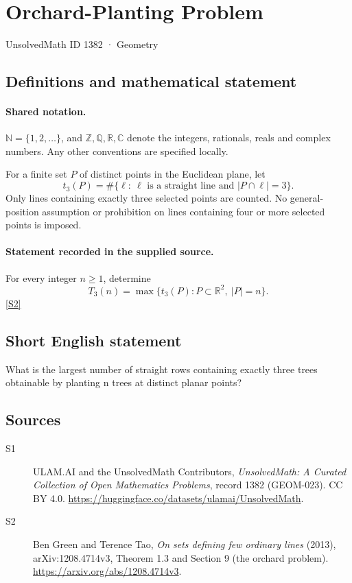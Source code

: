 \documentclass[11pt]{article}
\newcommand{\sref}[2]{\hyperlink{source:#1:#2}{[S#2]}}
\begin{document}
\setcounter{section}{1381}
\section{Orchard-Planting Problem}\label{1382}
{\small\sffamily UnsolvedMath ID 1382 · Geometry}
\subsection{Definitions and mathematical statement}

\paragraph{Shared notation.}$\mathbb N=\{1,2,\ldots\}$, and $\mathbb Z,\mathbb Q,\mathbb R,\mathbb C$ denote the integers, rationals, reals and complex numbers. Any other conventions are specified locally.


For a finite set $P$ of distinct points in the Euclidean plane, let
\[
 t_3(P)=\#\{\ell:\ \ell\text{ is a straight line and }|P\cap\ell|=3\}.
\]
Only lines containing exactly three selected points are counted. No general-position assumption or prohibition on lines containing four or more selected points is imposed.
\paragraph{Statement recorded in the supplied source.}
For every integer $n\ge1$, determine
\[
 T_3(n)=\max\{t_3(P):P\subset\mathbb R^2,\ |P|=n\}.
\]
\sref{1382}{2}
\subsection{Short English statement}
What is the largest number of straight rows containing exactly three trees obtainable by planting n trees at distinct planar points?
\subsection{Sources}
\begin{description}
\item[\hypertarget{source:1382:1}{S1}] ULAM.AI and the UnsolvedMath Contributors, \emph{UnsolvedMath: A Curated Collection of Open Mathematics Problems}, record 1382 (GEOM-023). CC BY 4.0. \url{https://huggingface.co/datasets/ulamai/UnsolvedMath}.
\item[\hypertarget{source:1382:2}{S2}] Ben Green and Terence Tao, \emph{On sets defining few ordinary lines} (2013), arXiv:1208.4714v3, Theorem 1.3 and Section 9 (the orchard problem). \url{https://arxiv.org/abs/1208.4714v3}.
\end{description}
\label{end:1382}
\end{document}
